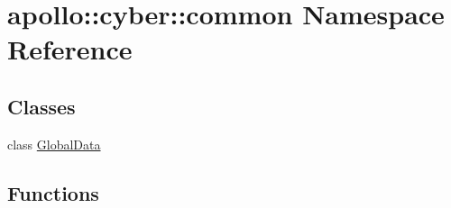 \hypertarget{namespaceapollo_1_1cyber_1_1common}{\section{apollo\-:\-:cyber\-:\-:common Namespace Reference}
\label{namespaceapollo_1_1cyber_1_1common}
}
\subsection*{Classes}
\begin{DoxyCompactItemize}
\item 
class \hyperlink{classapollo_1_1cyber_1_1common_1_1GlobalData}{Global\-Data}
\end{DoxyCompactItemize}
\subsection*{Functions}
